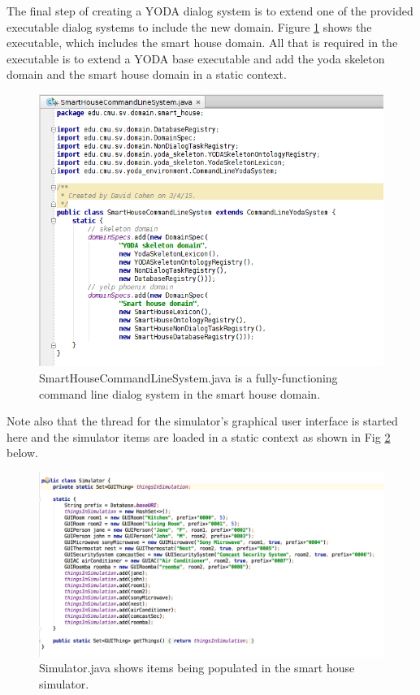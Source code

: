 \documentclass[titlepage]{article}
\begin{document}
The final step of creating a YODA dialog system is to extend one of the provided executable dialog systems to include the new domain. Figure \ref{fig:smart_house_command_line_system} shows the executable, which includes the smart house domain. All that is required in the executable is to extend a YODA base executable and add the yoda skeleton domain and the smart house domain in a static context.

\begin{figure}[h!]
\centering
\includegraphics[width=\textwidth]{SmartHouseCommandLineExecutable}
\caption{SmartHouseCommandLineSystem.java is a fully-functioning command line dialog system in the smart house domain.}
\label{fig:smart_house_command_line_system}
\end{figure}

Note also that the thread for the simulator’s graphical user interface is started here and the simulator items are loaded in a static context as shown in Fig \ref{fig:smart_house_simulator} below.

\begin{figure}[h!]
\centering
\includegraphics[width=\textwidth]{SmartHouseSimulator}
\caption{Simulator.java shows items being populated in the smart house simulator.}
\label{fig:smart_house_simulator}
\end{figure}
\end{document}
